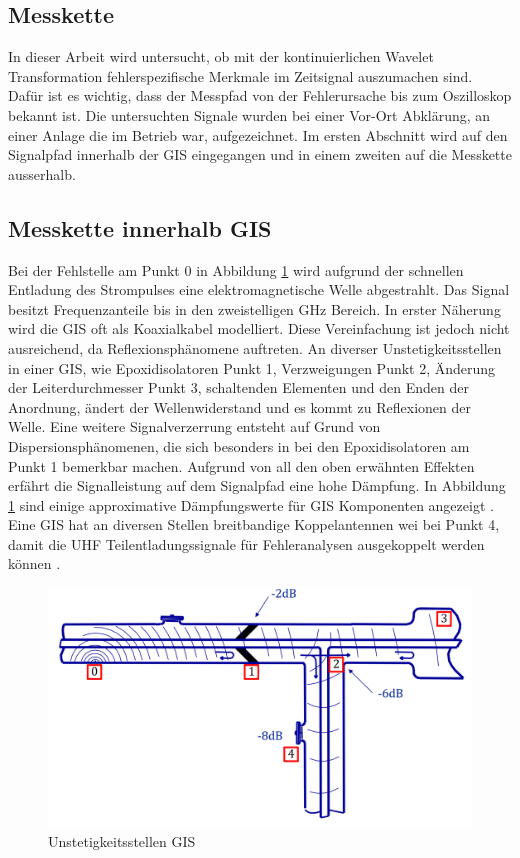 \begin{refsection}
\section{Messkette}
In dieser Arbeit wird untersucht, ob mit der kontinuierlichen Wavelet Transformation fehlerspezifische Merkmale im Zeitsignal auszumachen sind. 
Dafür ist es wichtig, dass der Messpfad von der Fehlerursache bis zum Oszilloskop bekannt ist. 
Die untersuchten Signale wurden bei einer Vor-Ort Abklärung, an einer Anlage die im Betrieb war, aufgezeichnet.  
Im ersten Abschnitt wird auf den Signalpfad innerhalb der GIS eingegangen und in einem zweiten auf die Messkette ausserhalb.
\subsection{Messkette innerhalb GIS}
Bei der Fehlstelle am Punkt 0 in Abbildung \ref{fig:messketteingis} wird aufgrund der schnellen Entladung des Strompulses eine elektromagnetische Welle abgestrahlt. 
Das Signal besitzt Frequenzanteile bis in den zweistelligen GHz Bereich. 
In erster Näherung wird die GIS oft als Koaxialkabel modelliert. 
Diese Vereinfachung ist jedoch nicht ausreichend, da Reflexionsphänomene auftreten. 
An diverser Unstetigkeitsstellen in einer GIS, wie Epoxidisolatoren Punkt 1, Verzweigungen Punkt 2,  Änderung der Leiterdurchmesser Punkt 3, schaltenden Elementen und den Enden der Anordnung, ändert der Wellenwiderstand und es kommt zu Reflexionen der Welle.
Eine weitere Signalverzerrung entsteht auf Grund von Dispersionsphänomenen, die sich besonders in bei den Epoxidisolatoren am Punkt 1 bemerkbar machen. 
Aufgrund von all den oben erwähnten Effekten erfährt die Signalleistung auf dem Signalpfad eine hohe Dämpfung.
In Abbildung \ref{fig:messketteingis} sind einige approximative Dämpfungswerte für GIS Komponenten angezeigt  \cite{report:PDBasicABB}.
Eine GIS hat an diversen Stellen breitbandige Koppelantennen wei bei Punkt 4, damit die UHF Teilentladungssignale für Fehleranalysen ausgekoppelt werden können \cite{buch:UHFSignale, skript:Judd24ps, buch:Kuchler}.
\begin{figure}
	\centering
	\includegraphics[width=0.5\linewidth]{papers/gis/Bilder/MessketteInGIS}
	\caption{Unstetigkeitsstellen GIS \cite{report:PDBasicABB}}
	\label{fig:messketteingis}
\end{figure}

\end{refsection}
